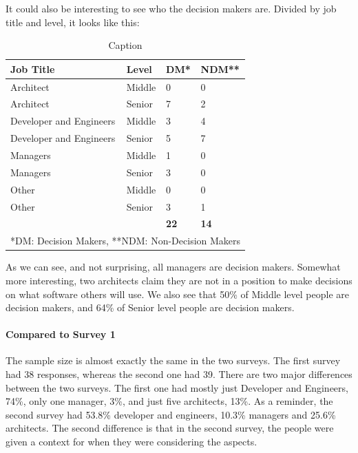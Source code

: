 \documentclass{article}
\begin{document}
It could also be interesting to see who the decision makers are. Divided
by job title and level, it looks like this:

\begin{table}[H]
\centering
\begin{tabular}{l l l l}
\textbf{Job Title} & \textbf{Level} & \textbf{DM*} & \textbf{NDM**} \\ \hline
Architect & Middle & 0 & 0                   \\
Architect               & Senior & 7 & 2                   \\ \hline
Developer and Engineers & Middle & 3 & 4                   \\
Developer and Engineers & Senior & 5 & 7                   \\ \hline
Managers                & Middle & 1 & 0                   \\
Managers & Senior & 3 & 0                   \\ \hline
Other & Middle & 0 & 0                   \\
Other & Senior & 3 & 1                   \\ \hdashline
& &     \textbf{22}          & \textbf{14}              \\ \hline\hline
\multicolumn{4}{l}{*DM: Decision Makers, **NDM: Non-Decision Makers}

\end{tabular}
\caption{Caption}
\label{tab:my_label}
\end{table}

As we can see, and not surprising, all managers are decision makers.
Somewhat more interesting, two architects claim they are not in a
position to make decisions on what software others will use. We also see
that 50\% of Middle level people are decision makers, and 64\% of Senior
level people are decision makers.


\paragraph{Compared to Survey 1}

The sample size is almost exactly the same in the two surveys. The first
survey had 38 responses, whereas the second one had 39. There are two
major differences between the two surveys. The first one had mostly just
Developer and Engineers, 74\%, only one manager, 3\%, and just five
architects, 13\%. As a reminder, the second survey had 53.8\% developer
and engineers, 10.3\% managers and 25.6\% architects. The second
difference is that in the second survey, the people were given a context
for when they were considering the aspects.
\end{document}

